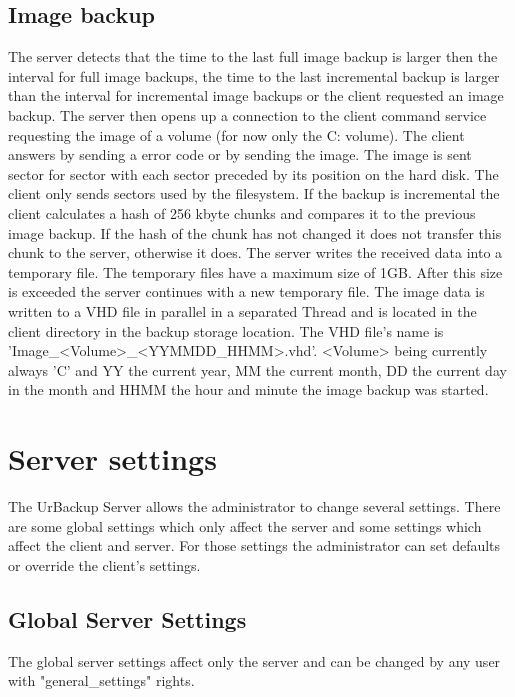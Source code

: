 \documentclass[a4paper,10pt]{article}
\begin{document}
\subsection{Image backup}

The server detects that the time to the last full image backup is larger then the interval for full image backups, the time to the last incremental backup is larger than the interval for incremental image backups or the client requested an image backup. The server then opens up a connection to the client command service requesting the image of a volume (for now only the C: volume). The client answers by sending a error code or by sending the image. The image is sent sector for sector with each sector preceded by its position on the hard disk. The client only sends sectors used by the filesystem. If the backup is incremental the client calculates a hash of 256 kbyte chunks and compares it to the previous image backup. If the hash of the chunk has not changed it does not transfer this chunk to the server, otherwise it does. The server writes the received data into a temporary file. The temporary files have a maximum size of 1GB. After this size is exceeded the server continues with a new temporary file. The image data is written to a VHD file in parallel in a separated Thread and is located in the client directory in the backup storage location. The VHD file's name is 'Image\_<Volume>\_<YYMMDD\_HHMM>.vhd'. <Volume> being currently always 'C' and YY the current year, MM the current month, DD the current day in the month and HHMM the hour and minute the image backup was started.

\section{Server settings}
\label{server_settings}

The UrBackup Server allows the administrator to change several settings. There are some global settings which only affect the server and some settings which affect the client and server. For those settings the administrator can set defaults or override the client's settings.

\subsection{Global Server Settings}

The global server settings affect only the server and can be changed by any user with "general\_settings" rights.
\end{document}
